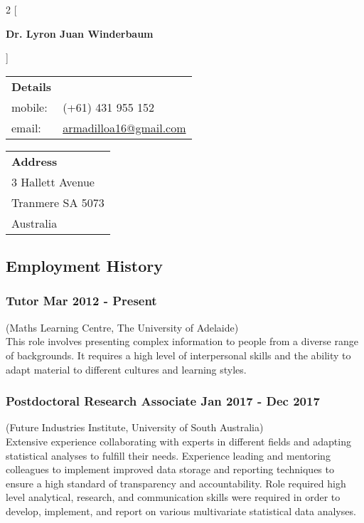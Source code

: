 \documentclass[a4paper,12pt]{report}
\begin{document}
 

\begin{multicols}{2}
[
\begin{center}
{\Large \textbf{Dr. Lyron Juan Winderbaum}} \\ \vspace{4mm}
\end{center}
]

\begin{flushleft}
\begin{tabular}{ll}
\textbf{Details} & \\ 
mobile: & (+61) 431 955 152 \\
email: & \href{mailto:armadilloa16@gmail.com}{armadilloa16@gmail.com} \\
\end{tabular}
\end{flushleft}

\begin{flushright}
\begin{tabular}{l}
\textbf{Address} \\
3 Hallett Avenue \\  
Tranmere
SA 5073 \\
Australia
\end{tabular}
\end{flushright}
\end{multicols}                                  

\subsection*{Employment History}

\subsubsection*{Tutor \hfill Mar 2012 - Present} \vspace{-6pt}
(Maths Learning Centre, The University of Adelaide) \\[4pt]
This role involves presenting complex information to people from a diverse range of backgrounds. It requires a high level of interpersonal skills and the ability to adapt material to different cultures and learning styles.

\subsubsection*{Postdoctoral Research Associate  \hfill Jan 2017 - Dec 2017} \vspace{-6pt}
(Future Industries Institute, University of South Australia) \\[4pt]
Extensive experience collaborating with experts in different fields and adapting statistical analyses to fulfill their needs.
Experience leading and mentoring colleagues to implement improved data storage and reporting techniques to ensure a high standard of transparency and accountability.
Role required high level analytical, research, and communication skills were required in order to develop, implement, and report on various multivariate statistical data analyses.
\end{document}
